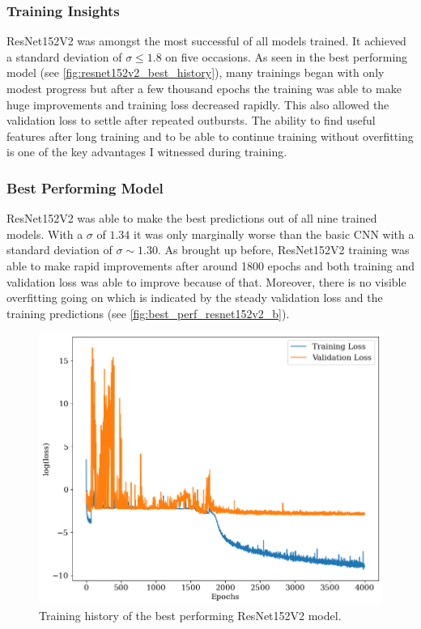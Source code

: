 \subsubsection*{Training Insights}
ResNet152V2 was amongst the most successful of all models trained. It achieved a standard deviation of $ \sigma \le 1.8$ on five occasions. As seen in the best performing model (see \autoref{fig:resnet152v2_best_history}), many trainings began with only modest progress but after a few thousand epochs the training was able to make huge improvements and training loss decreased rapidly. This also allowed the validation loss to settle after repeated outbursts. The ability to find useful features after long training and to be able to continue training without overfitting is one of the key advantages I witnessed during training.   
\subsubsection*{Best Performing Model}
ResNet152V2 was able to make the best predictions out of all nine trained models. With a $\sigma$ of $1.34$ it was only marginally worse than the basic CNN with a standard deviation of $\sigma \sim 1.30$. As brought up before, ResNet152V2 training was able to make rapid improvements after around 1800 epochs and both training and validation loss was able to improve because of that. Moreover, there is no visible overfitting going on which is indicated by the steady validation loss and the training predictions (see \autoref{fig:best_perf_resnet152v2_b}).

\begin{figure}[H]
\centering
\includegraphics[width=.667\textwidth]{images/Chapter4/Res152V2/res152v2_history.png}
\caption{Training history of the best performing ResNet152V2 model.} 
\label{fig:resnet152v2_best_history}
\end{figure}

